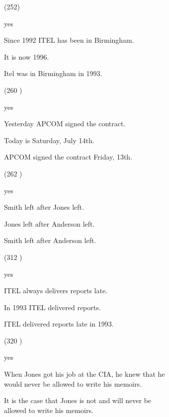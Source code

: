 \documentclass[a4paper,twoside]{article}
\newcommand\hyp{\item[H]}
\newcommand\answer{\item[A]}
\newcommand\fracasex[2]{\begin{lingex}\item[(#1)] \begin{subex} #2 \end{subex} \end{lingex} }
\begin{document}
\begin{figure*}
\begin{subfigure}{0.5\textwidth}

\fracasex{252}{\answer yes
\item	Since 1992 ITEL has been in Birmingham.
\item	It is now 1996.
\hyp    Itel was in Birmingham in 1993.
} \fracasex{260	}{\answer yes
\item	Yesterday APCOM signed the contract.
\item	Today is Saturday, July 14th.
\hyp    APCOM signed the contract Friday, 13th.

} \fracasex{262	}{\answer yes
\item	Smith left after Jones left.
\item	Jones left after Anderson left.
\hyp    Smith left after Anderson left.

} \fracasex{312	}{\answer yes
\item	ITEL always delivers reports late.
\item	In 1993 ITEL delivered reports.
\hyp    ITEL delivered reports late in 1993.

} \fracasex{320	}{\answer yes
\item	When Jones got his job at the CIA, he knew that he would never be allowed to write his memoirs.
\hyp    It is the case that Jones is not and will never be allowed to write his memoirs.
}


\end{subfigure}
\end{figure*}
\end{document}
